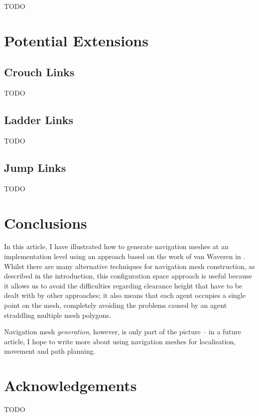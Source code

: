 \documentclass[10pt,twocolumn]{article}
\begin{document}
TODO

\section{Potential Extensions}

\subsection{Crouch Links}

TODO

\subsection{Ladder Links}

TODO

\subsection{Jump Links}

TODO

\section{Conclusions}

In this article, I have illustrated how to generate navigation meshes at an implementation level using an approach based on the work of van Waveren in \cite{vanwaveren01}. Whilst there are many alternative techniques for navigation mesh construction, as described in the introduction, this configuration space approach is useful because it allows us to avoid the difficulties regarding clearance height that have to be dealt with by other approaches; it also means that each agent occupies a single point on the mesh, completely avoiding the problems caused by an agent straddling multiple mesh polygons.

Navigation mesh \emph{generation}, however, is only part of the picture -- in a future article, I hope to write more about using navigation meshes for localisation, movement and path planning.

\section{Acknowledgements}

TODO




\end{document}
